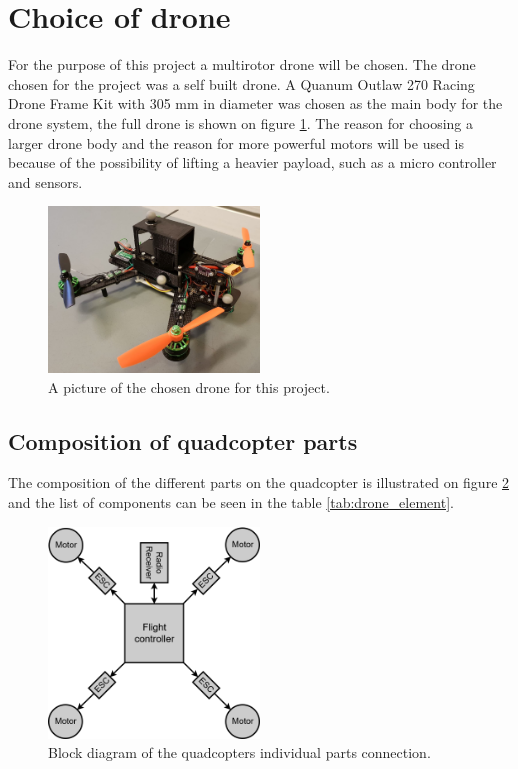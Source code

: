 \section{Choice of drone}\label{s:vores_drone}
For the purpose of this project a multirotor drone will be chosen. The drone chosen for the project was a self built drone.
A Quanum Outlaw 270 Racing Drone Frame Kit with 305 mm in diameter was chosen as the main body for the drone system, the full drone is shown on figure \ref{fig:TheChosenOne}. The reason for choosing a larger drone body and the reason for more powerful motors will be used is because of the possibility of lifting a heavier payload, such as a micro controller and sensors. 

\begin{figure}[H]
    \centering
    \includegraphics[width=0.5\textwidth]{figures/ch_intro/TheChosenOne2.jpg}
    \caption{A picture of the chosen drone for this project.}
    \label{fig:TheChosenOne}
\end{figure}

\subsection*{Composition of quadcopter parts}
The composition of the different parts on the quadcopter is illustrated on figure \ref{fig:blockdiagramDrone} and the list of components can be seen in the table \ref{tab:drone_element}. 

\begin{figure}[H]
    \centering
    \includegraphics[width=0.5\textwidth]{figures/ch_intro/BlockdiagramOfTheDrone.png}
    \caption{Block diagram of the quadcopters individual parts connection.}
    \label{fig:blockdiagramDrone}
\end{figure}

